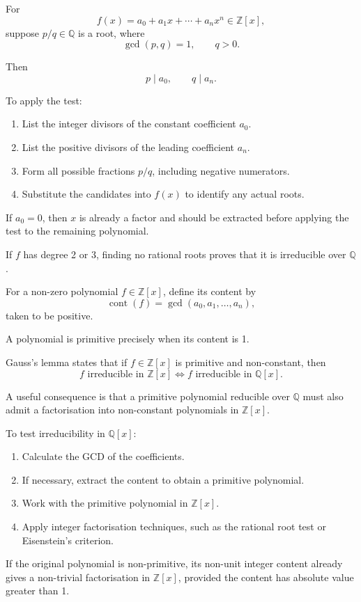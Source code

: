 \begin{method}
For
\[
f(x)=a_0+a_1x+\cdots+a_nx^n\in\mathbb{Z}[x],
\]
suppose \(p/q\in\mathbb{Q}\) is a root, where
\[
\gcd(p,q)=1,\qquad q>0.
\]

Then
\[
\boxed{p\mid a_0,\qquad q\mid a_n.}
\]

To apply the test:

\begin{enumerate}
    \item List the integer divisors of the constant coefficient \(a_0\).
    \item List the positive divisors of the leading coefficient \(a_n\).
    \item Form all possible fractions \(p/q\), including negative numerators.
    \item Substitute the candidates into \(f(x)\) to identify any actual roots.
\end{enumerate}

If \(a_0=0\), then \(x\) is already a factor and should be extracted before applying the test to the remaining polynomial.

If \(f\) has degree 2 or 3, finding no rational roots proves that it is irreducible over \(\mathbb{Q}\).
\end{method}

\begin{method}
For a non-zero polynomial \(f\in\mathbb{Z}[x]\), define its content by
\[
\operatorname{cont}(f)=\gcd(a_0,a_1,\ldots,a_n),
\]
taken to be positive.

A polynomial is primitive precisely when its content is 1.

Gauss's lemma states that if \(f\in\mathbb{Z}[x]\) is primitive and non-constant, then
\[
\boxed{
f\text{ irreducible in }\mathbb{Z}[x]
\iff
f\text{ irreducible in }\mathbb{Q}[x].
}
\]

A useful consequence is that a primitive polynomial reducible over \(\mathbb{Q}\) must also admit a factorisation into non-constant polynomials in \(\mathbb{Z}[x]\).

To test irreducibility in \(\mathbb{Q}[x]\):

\begin{enumerate}
    \item Calculate the GCD of the coefficients.
    \item If necessary, extract the content to obtain a primitive polynomial.
    \item Work with the primitive polynomial in \(\mathbb{Z}[x]\).
    \item Apply integer factorisation techniques, such as the rational root test or Eisenstein's criterion.
\end{enumerate}

If the original polynomial is non-primitive, its non-unit integer content already gives a non-trivial factorisation in \(\mathbb{Z}[x]\), provided the content has absolute value greater than 1.
\end{method}

